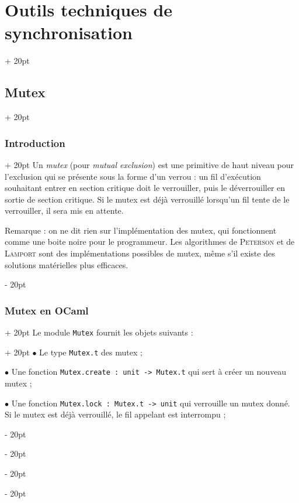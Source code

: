\documentclass[a4paper, 12pt, twoside]{article}
\newcommand{\ind}[1][20pt]{\advance\leftskip + #1}
\newcommand{\deind}[1][20pt]{\advance\leftskip - #1}
\newenvironment{indt}[2][20pt]{#2 \par \ind[#1]}{\par \deind} %
\begin{document}
    \begin{indt}{\section{Outils techniques de synchronisation}}
        \begin{indt}{\subsection{Mutex}}
            \begin{indt}{\subsubsection{Introduction}}
                Un \emph{mutex} (pour \textit{mutual exclusion}) est une primitive de haut niveau pour l'exclusion qui se présente sous la forme d'un verrou : un fil d'exécution souhaitant entrer en section critique doit le verrouiller, puis le déverrouiller en sortie de section critique.
                Si le mutex est déjà verrouillé lorsqu'un fil tente de le verrouiller, il sera mis en attente.

                \vspace{12pt}
                
                Remarque : on ne dit rien sur l'implémentation des mutex, qui fonctionnent comme une boite noire pour le programmeur. Les algorithmes de \textsc{Peterson} et de \textsc{Lamport} sont des implémentations possibles de mutex, même s'il existe des solutions matérielles plus efficaces.
            \end{indt}

            \vspace{12pt}
            
            \begin{indt}{\subsubsection{Mutex en OCaml}}
                \begin{indt}{Le module \texttt{Mutex} fournit les objets suivants :}
                    $\bullet$ Le type \texttt{Mutex.t} des mutex ;

                    $\bullet$ Une fonction \texttt{Mutex.create : unit -> Mutex.t} qui sert à créer un nouveau mutex ;

                    $\bullet$ Une fonction \texttt{Mutex.lock : Mutex.t -> unit} qui verrouille un mutex donné.
                    Si le mutex est déjà verrouillé, le fil appelant est interrompu ;


\end{indt}
\end{indt}
\end{indt}
\end{indt}
\end{document}
